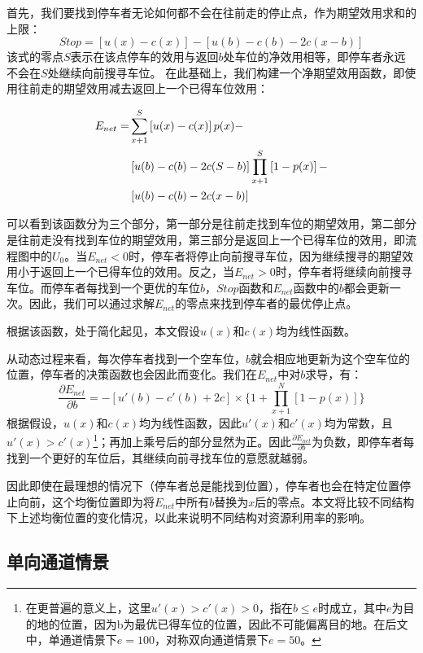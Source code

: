 \documentclass{thuemp}
\begin{document}
\par 首先，我们要找到停车者无论如何都不会在往前走的停止点，作为期望效用求和的上限：
$$Stop = [u(x)-c(x)]-[u(b)-c(b)-2c(x-b)]$$
该式的零点$S$表示在该点停车的效用与返回$b$处车位的净效用相等，即停车者永远不会在$S$处继续向前搜寻车位。
在此基础上，我们构建一个净期望效用函数，即使用往前走的期望效用减去返回上一个已得车位效用：
\par\begin{align}
        E_{net} = &\sum_{x+1}^S \left[u(x)-c(x)\right]p(x)- \notag\\ &\left[u(b)-c(b)-2c(S-b)\right]\prod_{x+1}^S \left[1-p(x)\right] - \notag\\ &\left[u(b)-c(b) - 2c(x-b)\right] \notag
    \end{align}
\par 可以看到该函数分为三个部分，第一部分是往前走找到车位的期望效用，第二部分是往前走没有找到车位的期望效用，第三部分是返回上一个已得车位的效用，即流程图中的$U_0$。当$E_{net}<0$时，停车者将停止向前搜寻车位，因为继续搜寻的期望效用小于返回上一个已得车位的效用。反之，当$E_{net}>0$时，停车者将继续向前搜寻车位。而停车者每找到一个更优的车位$b$，$Stop$函数和$E_{net}$函数中的$b$都会更新一次。因此，我们可以通过求解$E_{net}$的零点来找到停车者的最优停止点。
\par 根据该函数，处于简化起见，本文假设$u(x)$和$c(x)$均为线性函数。
\par 从动态过程来看，每次停车者找到一个空车位，$b$就会相应地更新为这个空车位的位置，停车者的决策函数也会因此而变化。我们在$E_{net}$中对$b$求导，有：
$$\frac{\partial E_{net}}{\partial b} = -[u'(b)-c'(b)+2c]\times\{1+\prod_{x+1}^N \left[1-p(x)\right]\}$$
根据假设，$u(x)$和$c(x)$均为线性函数，因此$u'(x)$和$c'(x)$均为常数，且$u'(x)>c'(x)$\footnote{在更普遍的意义上，这里$u'(x)>c'(x)>0$，指在$b\leq e$时成立，其中$e$为目的地的位置，因为b为最优已得车位的位置，因此不可能偏离目的地。在后文中，单通道情景下$e=100$，对称双向通道情景下$e=50$。}；再加上乘号后的部分显然为正。因此$\frac{\partial E_{net}}{\partial b}$为负数，即停车者每找到一个更好的车位后，其继续向前寻找车位的意愿就越弱。
\par 因此即使在最理想的情况下（停车者总是能找到位置），停车者也会在特定位置停止向前，这个均衡位置即为将$E_{net}$中所有$b$替换为$x$后的零点。本文将比较不同结构下上述均衡位置的变化情况，以此来说明不同结构对资源利用率的影响。



\subsection{单向通道情景}
\end{document}
